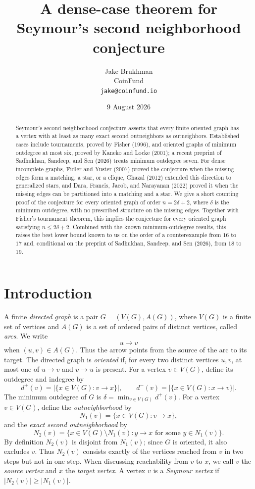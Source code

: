 \documentclass[12pt]{article}
\title{A dense-case theorem for Seymour's second neighborhood conjecture}
\author{Jake Brukhman\\{\small CoinFund}\\{\small\texttt{jake@coinfund.io}}}
\date{9 August 2026}
\theoremstyle{plainsl}
\theoremstyle{remark}
\begin{document}
\maketitle
{\let\thefootnote\relax
{}}

\begin{abstract}
Seymour's second neighborhood conjecture asserts that every finite oriented
graph has a vertex with at least as many exact second outneighbors as
outneighbors.  Established cases include tournaments, proved by Fisher (1996),
and oriented graphs of minimum outdegree at most six, proved by Kaneko and
Locke (2001); a recent preprint of Sadhukhan, Sandeep, and Sen (2026) treats
minimum outdegree seven.  For dense incomplete graphs, Fidler and Yuster (2007)
proved the conjecture when the missing edges form a matching, a star, or a
clique, Ghazal (2012) extended this direction to generalized stars, and Dara,
Francis, Jacob, and Narayanan (2022) proved it when the missing edges can be
partitioned into a matching and a star.  We give a
short counting proof of the conjecture for every oriented graph of order
$n=2\delta+2$, where $\delta$ is the minimum outdegree, with no prescribed
structure on the missing edges.  Together with Fisher's tournament theorem,
this implies the conjecture for every oriented graph satisfying
$n\le2\delta+2$.  Combined with the known minimum-outdegree results, this
raises the best lower bound known to us on the order of a counterexample from
$16$ to $17$ and, conditional on the preprint of Sadhukhan, Sandeep, and Sen
(2026), from $18$ to $19$.
\end{abstract}

\section{Introduction}

A finite \emph{directed graph} is a pair
$G=(V(G),A(G))$, where $V(G)$ is a finite set of vertices and
$A(G)$ is a set of ordered pairs of distinct vertices, called \emph{arcs}.
We write
\[
 u\to v
\]
when $(u,v)\in A(G)$.  Thus the arrow points from the source of the arc to
its target.  The directed graph is \emph{oriented} if, for every two distinct
vertices $u,v$, at most one of $u\to v$ and $v\to u$ is present. For a vertex $v\in V(G)$, define its outdegree and indegree by
\[
 d^+(v)=|\{x\in V(G):v\to x\}|,
 \qquad
 d^-(v)=|\{x\in V(G):x\to v\}|.
\]
The minimum outdegree of $G$ is
$\delta=\min_{v\in V(G)}d^+(v).$ For a vertex $v\in V(G)$, define the \emph{outneighborhood} by
\[
 N_1(v)=\{x\in V(G):v\to x\},
\]
and the \emph{exact second outneighborhood} by
\[
 N_2(v)=
 \{x\in V(G)\setminus N_1(v):
   y\to x\text{ for some }y\in N_1(v)\}.
\]
By definition $N_2(v)$ is disjoint from $N_1(v)$; since $G$ is oriented, it also excludes $v$. Thus $N_2(v)$ consists exactly of the vertices reached from $v$ in two steps but not in one step.  When discussing reachability from $v$ to $x$, we call $v$ the \emph{source vertex} and $x$ the \emph{target vertex}. A vertex $v$ is a \emph{Seymour vertex} if $|N_2(v)|\ge|N_1(v)|.$
\end{document}

